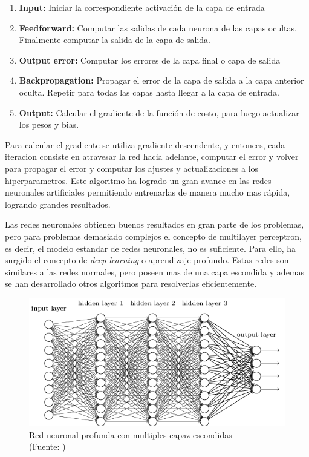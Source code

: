 \begin{enumerate}
\item \textbf{Input:} Iniciar la correspondiente activación de la capa de entrada

\item \textbf{Feedforward:} Computar las salidas de cada neurona de las capas ocultas. Finalmente computar la salida de la capa de salida.

\item \textbf{Output error:} Computar los errores de la capa final o capa de salida

\item \textbf{Backpropagation:} Propagar el error de la capa de salida a la capa anterior oculta. Repetir para todas las capas hasta llegar a la capa de entrada.

\item \textbf{Output:} Calcular el gradiente de la función de costo, para luego actualizar los pesos y bias.

\end{enumerate}

Para calcular el gradiente se utiliza gradiente descendente, y entonces, cada iteracion consiste en atravesar la red hacia adelante, computar el error y volver para propagar el error y computar los ajustes y actualizaciones a los hiperparametros. Este algoritmo ha logrado un gran avance en las redes neuronales artificiales permitiendo entrenarlas de manera mucho mas rápida, logrando grandes resultados.

Las redes neuronales obtienen buenos resultados en gran parte de los problemas, pero para problemas demasiado complejos el concepto de multilayer perceptron, es decir, el modelo estandar de redes neuronales, no es suficiente. Para ello, ha surgido el concepto de \textit{deep learning} o aprendizaje profundo. Estas redes son similares a las redes normales, pero poseen mas de una capa escondida y ademas se han desarrollado otros algoritmos para resolverlas eficientemente. 

\begin{figure}[ht!]
\centering
\includegraphics[width=.6\textwidth]{figures/deep.png}
\caption[abs]{Red neuronal profunda con multiples capaz escondidas\\
{\scriptsize (Fuente: \cite{slp})}}
\label{fig:slp}
\end{figure}

